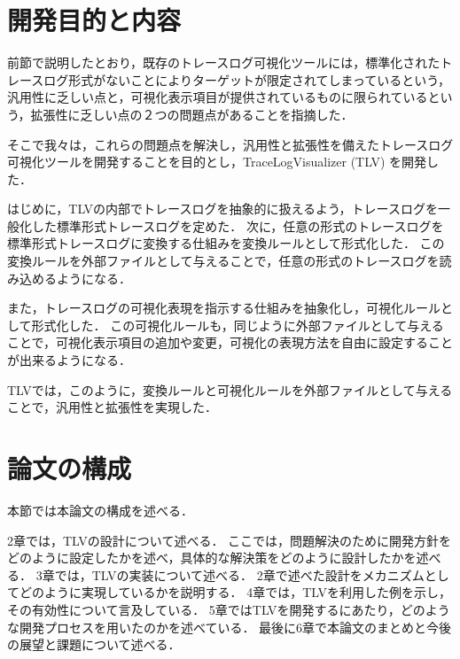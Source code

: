 \section{開発目的と内容}

前節で説明したとおり，既存のトレースログ可視化ツールには，標準化されたトレースログ形式がないことによりターゲットが限定されてしまっているという，汎用性に乏しい点と，可視化表示項目が提供されているものに限られているという，拡張性に乏しい点の２つの問題点があることを指摘した．

そこで我々は，これらの問題点を解決し，汎用性と拡張性を備えたトレースログ可視化ツールを開発することを目的とし，TraceLogVisualizer (TLV) を開発した．

はじめに，TLVの内部でトレースログを抽象的に扱えるよう，トレースログを一般化した標準形式トレースログを定めた．
次に，任意の形式のトレースログを標準形式トレースログに変換する仕組みを変換ルールとして形式化した．
この変換ルールを外部ファイルとして与えることで，任意の形式のトレースログを読み込めるようになる．

また，トレースログの可視化表現を指示する仕組みを抽象化し，可視化ルールとして形式化した．
この可視化ルールも，同じように外部ファイルとして与えることで，可視化表示項目の追加や変更，可視化の表現方法を自由に設定することが出来るようになる．

TLVでは，このように，変換ルールと可視化ルールを外部ファイルとして与えることで，汎用性と拡張性を実現した．

\section{論文の構成}
本節では本論文の構成を述べる．

2章では，TLVの設計について述べる．
ここでは，問題解決のために開発方針をどのように設定したかを述べ，具体的な解決策をどのように設計したかを述べる．
3章では，TLVの実装について述べる．
2章で述べた設計をメカニズムとしてどのように実現しているかを説明する．
4章では，TLVを利用した例を示し，その有効性について言及している．
5章ではTLVを開発するにあたり，どのような開発プロセスを用いたのかを述べている．
最後に6章で本論文のまとめと今後の展望と課題について述べる．